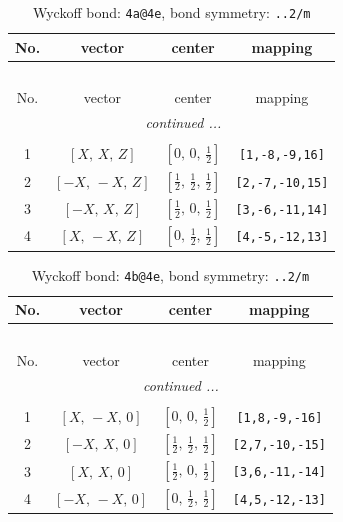 \documentclass[fleqn,8pt]{jsarticle}
\begin{document}
\begin{longtable}{cccc}
\caption{Wyckoff bond: {\tt 4a@4e}, bond symmetry: {\tt ..2/m}}
 \\
 \hline \hline
No. & vector & center & mapping \\ \hline \endfirsthead

\multicolumn{3}{l}{\tablename\ \thetable{}} \\
 \hline \hline
No. & vector & center & mapping \\ \hline \endhead

 \hline \hline
\multicolumn{3}{r}{\footnotesize\it continued ...} \\ \endfoot

 \hline \hline
\multicolumn{3}{r}{} \\ \endlastfoot

1 & $\left[ X,\, X,\, Z \right]$ & $\left[ 0,\, 0,\, \frac{1}{2} \right]$ & {\tt [1,-8,-9,16]} \\ \hline
2 & $\left[ - X,\, - X,\, Z \right]$ & $\left[ \frac{1}{2},\, \frac{1}{2},\, \frac{1}{2} \right]$ & {\tt [2,-7,-10,15]} \\ \hline
3 & $\left[ - X,\, X,\, Z \right]$ & $\left[ \frac{1}{2},\, 0,\, \frac{1}{2} \right]$ & {\tt [3,-6,-11,14]} \\ \hline
4 & $\left[ X,\, - X,\, Z \right]$ & $\left[ 0,\, \frac{1}{2},\, \frac{1}{2} \right]$ & {\tt [4,-5,-12,13]} \\
\end{longtable}
\renewcommand{\arraystretch}{1.2}
\begin{longtable}{cccc}
\caption{Wyckoff bond: {\tt 4b@4e}, bond symmetry: {\tt ..2/m}}
 \\
 \hline \hline
No. & vector & center & mapping \\ \hline \endfirsthead

\multicolumn{3}{l}{\tablename\ \thetable{}} \\
 \hline \hline
No. & vector & center & mapping \\ \hline \endhead

 \hline \hline
\multicolumn{3}{r}{\footnotesize\it continued ...} \\ \endfoot

 \hline \hline
\multicolumn{3}{r}{} \\ \endlastfoot

1 & $\left[ X,\, - X,\, 0 \right]$ & $\left[ 0,\, 0,\, \frac{1}{2} \right]$ & {\tt [1,8,-9,-16]} \\ \hline
2 & $\left[ - X,\, X,\, 0 \right]$ & $\left[ \frac{1}{2},\, \frac{1}{2},\, \frac{1}{2} \right]$ & {\tt [2,7,-10,-15]} \\ \hline
3 & $\left[ X,\, X,\, 0 \right]$ & $\left[ \frac{1}{2},\, 0,\, \frac{1}{2} \right]$ & {\tt [3,6,-11,-14]} \\ \hline
4 & $\left[ - X,\, - X,\, 0 \right]$ & $\left[ 0,\, \frac{1}{2},\, \frac{1}{2} \right]$ & {\tt [4,5,-12,-13]} \\
\end{longtable}
\end{document}
